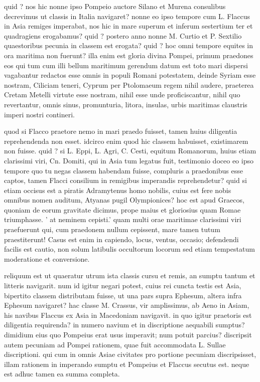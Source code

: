  quid ? nos hic nonne ipso Pompeio auctore Silano et Murena consulibus decrevimus ut classis in Italia navigaret? nonne eo ipso tempore cum L. Flaccus in Asia remiges imperabat, nos hic in mare superum et inferum sestertium ter et quadragiens erogabamus? quid ? postero anno nonne M. Curtio et P. Sextilio quaestoribus pecunia in classem est erogata? quid ? hoc omni tempore equites in ora maritima non fuerunt? illa enim est gloria divina Pompei, primum praedones eos qui tum cum illi bellum maritimum gerendum datum est toto mari dispersi vagabantur redactos esse omnis in populi Romani potestatem, deinde Syriam esse nostram, Ciliciam teneri, Cyprum per Ptolomaeum regem nihil audere, praeterea Cretam Metelli virtute esse nostram, nihil esse unde proficiscantur, nihil quo revertantur, omnis sinus, promunturia, litora, insulas, urbis maritimas claustris imperi nostri contineri.

 quod si Flacco praetore nemo in mari praedo fuisset, tamen huius diligentia reprehendenda non esset. idcirco enim quod hic classem habuisset, existimarem non fuisse. quid ? si L. Eppi, L. Agri, C. Cesti, equitum Romanorum, huius etiam clarissimi viri, Cn. Domiti, qui in Asia tum legatus fuit, testimonio doceo eo ipso tempore quo tu negas classem habendam fuisse, compluris a praedonibus esse captos, tamen Flacci consilium in remigibus imperandis reprehendetur? quid si etiam occisus est a piratis Adramytenus homo nobilis, cuius est fere nobis omnibus nomen auditum, Atyanas pugil Olympionices? hoc est apud Graecos, quoniam de eorum gravitate dicimus, prope maius et gloriosius quam Romae triumphasse. ' at neminem cepisti.' quam multi orae maritimae clarissimi viri praefuerunt qui, cum praedonem nullum cepissent, mare tamen tutum praestiterunt! Casus est enim in capiendo, locus, ventus, occasio; defendendi facilis est cautio, non solum latibulis occultorum locorum sed etiam tempestatum moderatione et conversione.

 reliquum est ut quaeratur utrum ista classis cursu et remis, an sumptu tantum et litteris navigarit. num id igitur negari potest, cuius rei cuncta testis est Asia, bipertito classem distributam fuisse, ut una pars supra Ephesum, altera infra Ephesum navigaret? hac classe M. Crassus, vir amplissimus, ab Aeno in Asiam, his navibus Flaccus ex Asia in Macedoniam navigavit. in quo igitur praetoris est diligentia requirenda? in numero navium et in discriptione aequabili sumptus? dimidium eius quo Pompeius erat usus imperavit; num potuit parcius? discripsit autem pecuniam ad Pompei rationem, quae fuit accommodata L. Sullae discriptioni. qui cum in omnis Asiae civitates pro portione pecuniam discripsisset, illam rationem in imperando sumptu et Pompeius et Flaccus secutus est. neque est adhuc tamen ea summa completa.

